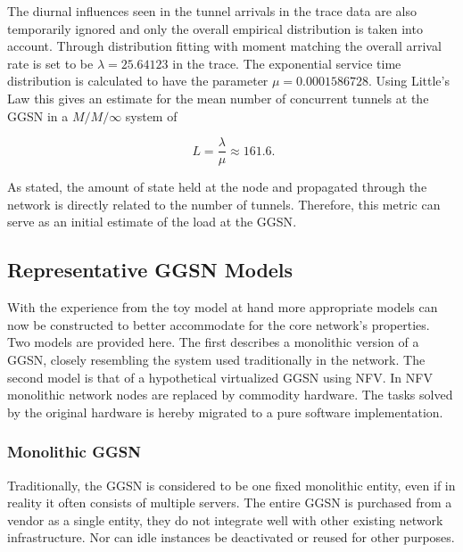 The diurnal influences seen in the tunnel arrivals in the trace data are also temporarily ignored and only the overall empirical distribution is taken into account. Through distribution fitting with moment matching the overall arrival rate is set to be $\lambda=25.64123$ in the trace. The exponential service time distribution is calculated to have the parameter $\mu=0.0001586728$. Using Little's Law this gives an estimate for the mean number of concurrent tunnels at the \gls{GGSN} in a $M/M/\infty$ system of 

\begin{equation}
	\phantom{.}L=\frac{\lambda}{\mu}\approx 161.6\text{.} %
\end{equation}

As stated, the amount of state held at the node and propagated through the network is directly related to the number of tunnels. Therefore, this metric can serve as an initial estimate of the load at the \gls{GGSN}.


\subsection{Representative GGSN Models} 

With the experience from the toy model at hand more appropriate models can now be constructed to better accommodate for the core network's properties. Two models are provided here.
The first describes a monolithic version of a \gls{GGSN}, closely resembling the system used traditionally in the network. The second model is that of a hypothetical virtualized \gls{GGSN} using \gls{NFV}. In \gls{NFV}~\cite{nfv_whitepaper} monolithic network nodes are replaced by commodity hardware. The tasks solved by the original hardware is hereby migrated to a pure software implementation.


\subsubsection{Monolithic \texorpdfstring{\acrshort{GGSN}}{GGSN}}

Traditionally, the \gls{GGSN} is considered to be one fixed monolithic entity, even if in reality it often consists of multiple servers. The entire \gls{GGSN} is purchased from a vendor as a single entity, they do not integrate well with other existing network infrastructure. Nor can idle instances be deactivated or reused for other purposes.

